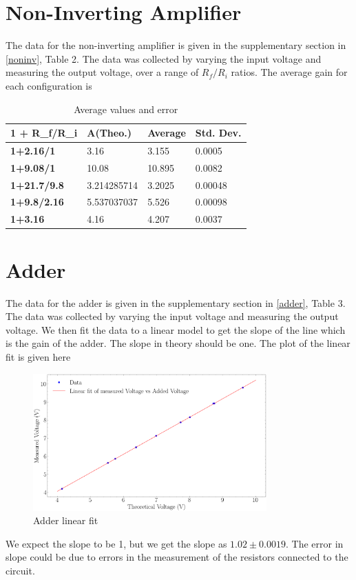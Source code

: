 \documentclass{scrartcl}
\newcommand{\1}{\mathbbm{1}}
\begin{document}
\section{Non-Inverting Amplifier}
The data for the non-inverting amplifier is given in the supplementary section in \cref{noninv}, Table 2. The data was collected by varying the input voltage and measuring the output voltage, over a range of
$R_f/R_i$ ratios. The average gain for each configuration is
\begin{table}[!ht]
    \centering
    \caption{Average values and error}
    \begin{tabular}{|l|l|l|l|}
    \hline
        \textbf{1 + R\_f/R\_i} & \textbf{A(Theo.)} & \textbf{Average} & \textbf{Std. Dev.} \\ \hline
        \textbf{1+2.16/1} & 3.16 & 3.155 & 0.0005 \\ \hline
        \textbf{1+9.08/1} & 10.08 & 10.895 & 0.0082 \\ \hline
        \textbf{1+21.7/9.8} & 3.214285714 & 3.2025 & 0.00048 \\ \hline
        \textbf{1+9.8/2.16} & 5.537037037 & 5.526 & 0.00098 \\ \hline
        \textbf{1+3.16} & 4.16 & 4.207 & 0.0037 \\ \hline
    \end{tabular}
    \label{avgnoninv}
\end{table}
\section{Adder}
The data for the adder is given in the supplementary section in \cref{adder}, Table 3. The data was collected by varying the input voltage and measuring the output voltage.
We then fit the data to a linear model to get the slope of the line which is the gain of the adder. The slope in theory should be one.
The plot of the linear fit is given here
\begin{figure}[H]
    \centering
    \includegraphics[width=0.8\textwidth]{Adder_plot.png}
    \caption{Adder linear fit}
\end{figure}
We expect the slope to be 1, but we get the slope as $\mathbf{1.02 \pm 0.0019}$. The error in slope could be due to errors in the measurement of 
the resistors connected to the circuit.
\end{document}
